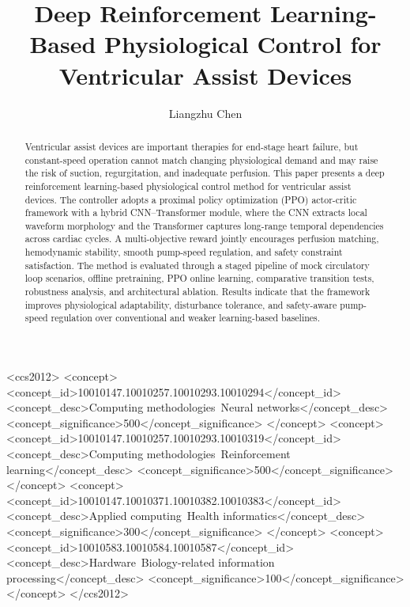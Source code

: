 \documentclass[sigconf]{acmart}
\begin{document}
\title{Deep Reinforcement Learning-Based Physiological Control for Ventricular Assist Devices}

\author{Liangzhu Chen}

\renewcommand{\shortauthors}{Chen}

\begin{abstract}
Ventricular assist devices are important therapies for end-stage heart failure, but constant-speed operation cannot match changing physiological demand and may raise the risk of suction, regurgitation, and inadequate perfusion. This paper presents a deep reinforcement learning-based physiological control method for ventricular assist devices. The controller adopts a proximal policy optimization (PPO) actor-critic framework with a hybrid CNN--Transformer module, where the CNN extracts local waveform morphology and the Transformer captures long-range temporal dependencies across cardiac cycles. A multi-objective reward jointly encourages perfusion matching, hemodynamic stability, smooth pump-speed regulation, and safety constraint satisfaction. The method is evaluated through a staged pipeline of mock circulatory loop scenarios, offline pretraining, PPO online learning, comparative transition tests, robustness analysis, and architectural ablation. Results indicate that the framework improves physiological adaptability, disturbance tolerance, and safety-aware pump-speed regulation over conventional and weaker learning-based baselines.
\end{abstract}

\begin{CCSXML}
<ccs2012>
 <concept>
  <concept_id>10010147.10010257.10010293.10010294</concept_id>
  <concept_desc>Computing methodologies~Neural networks</concept_desc>
  <concept_significance>500</concept_significance>
 </concept>
 <concept>
  <concept_id>10010147.10010257.10010293.10010319</concept_id>
  <concept_desc>Computing methodologies~Reinforcement learning</concept_desc>
  <concept_significance>500</concept_significance>
 </concept>
 <concept>
  <concept_id>10010147.10010371.10010382.10010383</concept_id>
  <concept_desc>Applied computing~Health informatics</concept_desc>
  <concept_significance>300</concept_significance>
 </concept>
 <concept>
  <concept_id>10010583.10010584.10010587</concept_id>
  <concept_desc>Hardware~Biology-related information processing</concept_desc>
  <concept_significance>100</concept_significance>
 </concept>
</ccs2012>
\end{CCSXML}
\end{document}
